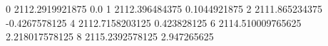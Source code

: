 0 2112.2919921875 0.0
1 2112.396484375 0.1044921875
2 2111.865234375 -0.4267578125
4 2112.7158203125 0.423828125
6 2114.510009765625 2.218017578125
8 2115.2392578125 2.947265625
